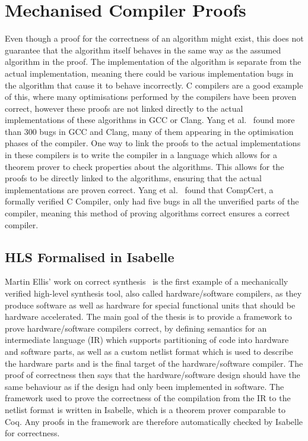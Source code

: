 \section{Mechanised Compiler Proofs}%
\label{sec:bg:mechanised-compiler-proofs}

Even though a proof for the correctness of an algorithm might exist, this does
not guarantee that the algorithm itself behaves in the same way as the assumed
algorithm in the proof.  The implementation of the algorithm is separate from
the actual implementation, meaning there could be various implementation bugs in
the algorithm that cause it to behave incorrectly.  C compilers are a good
example of this, where many optimisations performed by the compilers have been
proven correct, however these proofs are not linked directly to the actual
implementations of these algorithms in GCC or Clang.  Yang et
al.~\cite{yang11_findin_under_bugs_c_compil} found more than 300 bugs in GCC and
Clang, many of them appearing in the optimisation phases of the compiler.  One
way to link the proofs to the actual implementations in these compilers is to
write the compiler in a language which allows for a theorem prover to check
properties about the algorithms.  This allows for the proofs to be directly
linked to the algorithms, ensuring that the actual implementations are proven
correct.  Yang et al.~\cite{yang11_findin_under_bugs_c_compil} found that
CompCert, a formally verified C Compiler, only had five bugs in all the
unverified parts of the compiler, meaning this method of proving algorithms
correct ensures a correct compiler.

\subsection{HLS Formalised in Isabelle}

Martin Ellis' work on correct synthesis~\cite{ellis08_correc} is the first
example of a mechanically verified high-level synthesis tool, also called
hardware/software compilers, as they produce software as well as hardware for
special functional units that should be hardware accelerated.  The main goal of
the thesis is to provide a framework to prove hardware/software compilers
correct, by defining semantics for an intermediate language (IR) which supports
partitioning of code into hardware and software parts, as well as a custom
netlist format which is used to describe the hardware parts and is the final
target of the hardware/software compiler.  The proof of correctness then says
that the hardware/software design should have the same behaviour as if the
design had only been implemented in software.  The framework used to prove the
correctness of the compilation from the IR to the netlist format is written in
Isabelle, which is a theorem prover comparable to Coq.  Any proofs in the
framework are therefore automatically checked by Isabelle for correctness.

